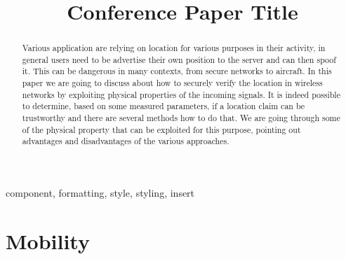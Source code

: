 \documentclass[conference]{IEEEtran}
\begin{document}
\title{Conference Paper Title}


\maketitle

\begin{abstract}
    Various application are relying on location for various purposes in their activity, in general users need to be advertise their own position to the server and can then spoof it. This can be dangerous in many contexts, from secure networks to aircraft. In this paper we are going to discuss about how to securely verify the location in wireless networks by exploiting physical properties of the incoming signals. It is indeed possible to determine, based on some measured parameters, if a location claim can be trustworthy and there are several methods how to do that. We are going through some of the physical property that can be exploited for this purpose, pointing out advantages and disadvantages of the various approaches.
\end{abstract}

\begin{IEEEkeywords}
component, formatting, style, styling, insert
\end{IEEEkeywords}

\section{Mobility}
\end{document}
